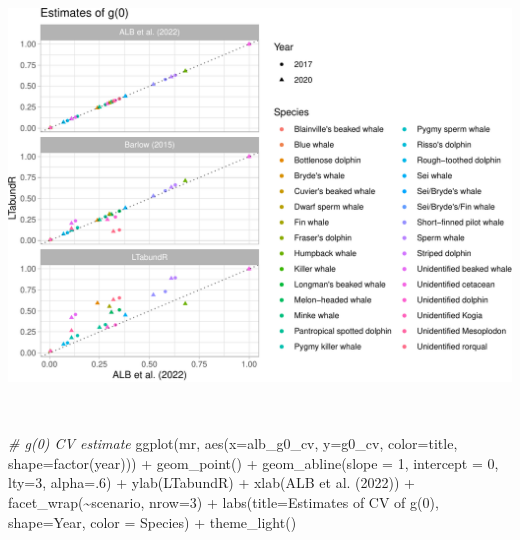 \documentclass[
]{book}
\newenvironment{Shaded}{\begin{snugshade}}{\end{snugshade}}
\newcommand{\AttributeTok}[1]{\textcolor[rgb]{0.77,0.63,0.00}{#1}}
\newcommand{\CommentTok}[1]{\textcolor[rgb]{0.56,0.35,0.01}{\textit{#1}}}
\newcommand{\DecValTok}[1]{\textcolor[rgb]{0.00,0.00,0.81}{#1}}
\newcommand{\FunctionTok}[1]{\textcolor[rgb]{0.00,0.00,0.00}{#1}}
\newcommand{\NormalTok}[1]{#1}
\newcommand{\SpecialCharTok}[1]{\textcolor[rgb]{0.00,0.00,0.00}{#1}}
\newcommand{\StringTok}[1]{\textcolor[rgb]{0.31,0.60,0.02}{#1}}
\begin{document}
\includegraphics{figures/unnamed-chunk-385-1.pdf}

~

\begin{Shaded}
\begin{Highlighting}[]
\CommentTok{\# g(0) CV estimate}
\FunctionTok{ggplot}\NormalTok{(mr,}
       \FunctionTok{aes}\NormalTok{(}\AttributeTok{x=}\NormalTok{alb\_g0\_cv, }\AttributeTok{y=}\NormalTok{g0\_cv, }
           \AttributeTok{color=}\NormalTok{title, }\AttributeTok{shape=}\FunctionTok{factor}\NormalTok{(year))) }\SpecialCharTok{+}
    \FunctionTok{geom\_point}\NormalTok{() }\SpecialCharTok{+}
    \FunctionTok{geom\_abline}\NormalTok{(}\AttributeTok{slope =} \DecValTok{1}\NormalTok{, }\AttributeTok{intercept =} \DecValTok{0}\NormalTok{, }\AttributeTok{lty=}\DecValTok{3}\NormalTok{, }\AttributeTok{alpha=}\NormalTok{.}\DecValTok{6}\NormalTok{) }\SpecialCharTok{+}
    \FunctionTok{ylab}\NormalTok{(}\StringTok{\textquotesingle{}LTabundR\textquotesingle{}}\NormalTok{) }\SpecialCharTok{+} \FunctionTok{xlab}\NormalTok{(}\StringTok{\textquotesingle{}ALB et al. (2022)\textquotesingle{}}\NormalTok{) }\SpecialCharTok{+}
  \FunctionTok{facet\_wrap}\NormalTok{(}\SpecialCharTok{\textasciitilde{}}\NormalTok{scenario, }\AttributeTok{nrow=}\DecValTok{3}\NormalTok{) }\SpecialCharTok{+} 
  \FunctionTok{labs}\NormalTok{(}\AttributeTok{title=}\StringTok{\textquotesingle{}Estimates of CV of g(0)\textquotesingle{}}\NormalTok{, }
       \AttributeTok{shape=}\StringTok{\textquotesingle{}Year\textquotesingle{}}\NormalTok{, }\AttributeTok{color =} \StringTok{\textquotesingle{}Species\textquotesingle{}}\NormalTok{) }\SpecialCharTok{+} 
  \FunctionTok{theme\_light}\NormalTok{()}
\end{Highlighting}
\end{Shaded}
\end{document}
